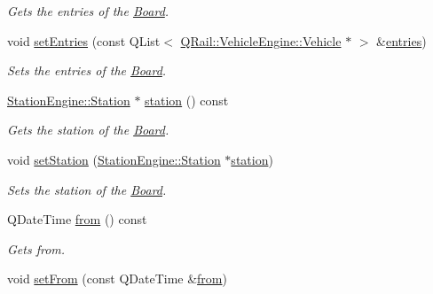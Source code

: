 \begin{DoxyCompactItemize}
\begin{DoxyCompactList}\small\item\em Gets the entries of the \mbox{\hyperlink{classQRail_1_1LiveboardEngine_1_1Board}{Board}}. \end{DoxyCompactList}\item 
void \mbox{\hyperlink{classQRail_1_1LiveboardEngine_1_1Board_a48325ac92e049047391823d2ea55c0d7}{set\+Entries}} (const Q\+List$<$ \mbox{\hyperlink{classQRail_1_1VehicleEngine_1_1Vehicle}{Q\+Rail\+::\+Vehicle\+Engine\+::\+Vehicle}} $\ast$ $>$ \&\mbox{\hyperlink{classQRail_1_1LiveboardEngine_1_1Board_afbba31f8d0f67e98f9bea58ebcf1e9ac}{entries}})
\begin{DoxyCompactList}\small\item\em Sets the entries of the \mbox{\hyperlink{classQRail_1_1LiveboardEngine_1_1Board}{Board}}. \end{DoxyCompactList}\item 
\mbox{\hyperlink{classQRail_1_1StationEngine_1_1Station}{Station\+Engine\+::\+Station}} $\ast$ \mbox{\hyperlink{classQRail_1_1LiveboardEngine_1_1Board_a96964c52def29a72003eb27701cafe12}{station}} () const
\begin{DoxyCompactList}\small\item\em Gets the station of the \mbox{\hyperlink{classQRail_1_1LiveboardEngine_1_1Board}{Board}}. \end{DoxyCompactList}\item 
void \mbox{\hyperlink{classQRail_1_1LiveboardEngine_1_1Board_ad54690cca1439296875c9c7c83234bd8}{set\+Station}} (\mbox{\hyperlink{classQRail_1_1StationEngine_1_1Station}{Station\+Engine\+::\+Station}} $\ast$\mbox{\hyperlink{classQRail_1_1LiveboardEngine_1_1Board_a96964c52def29a72003eb27701cafe12}{station}})
\begin{DoxyCompactList}\small\item\em Sets the station of the \mbox{\hyperlink{classQRail_1_1LiveboardEngine_1_1Board}{Board}}. \end{DoxyCompactList}\item 
Q\+Date\+Time \mbox{\hyperlink{classQRail_1_1LiveboardEngine_1_1Board_a503aaa8cea63f129e08581a49e308479}{from}} () const
\begin{DoxyCompactList}\small\item\em Gets from. \end{DoxyCompactList}\item 
void \mbox{\hyperlink{classQRail_1_1LiveboardEngine_1_1Board_af463ed571976fe8a7c49a365b7cc2ebe}{set\+From}} (const Q\+Date\+Time \&\mbox{\hyperlink{classQRail_1_1LiveboardEngine_1_1Board_a503aaa8cea63f129e08581a49e308479}{from}})

\end{DoxyCompactItemize}
